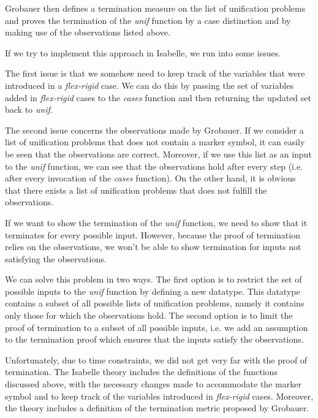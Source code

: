 Grobauer then defines a termination measure on the list of unification problems and proves the termination of the \textit{unif} function by a case distinction and by making use of the observations listed above.

If we try to implement this approach in Isabelle, we run into some issues.

The first issue is that we somehow need to keep track of the variables that were introduced in a \textit{flex-rigid} case. We can do this by passing the set of variables added in \textit{flex-rigid} cases to the \textit{cases} function and then returning the updated set back to \textit{unif}.

The second issue concerns the observations made by Grobauer. If we consider a list of unification problems that does not contain a marker symbol, it can easily be seen that the observations are correct. Moreover, if we use this list as an input to the \textit{unif} function, we can see that the observations hold after every step (i.e. after every invocation of the \textit{cases} function). On the other hand, it is obvious that there exists a list of unification problems that does not fulfill the observations.

If we want to show the termination of the \textit{unif} function, we need to show that it terminates for every possible input. However, because the proof of termination relies on the observations, we won't be able to show termination for inputs not satisfying the observations.

We can solve this problem in two ways. The first option is to restrict the set of possible inputs to the \textit{unif} function by defining a new datatype. This datatype contains a subset of all possible lists of unification problems, namely it contains only those for which the observations hold. The second option is to limit the proof of termination to a subset of all possible inputs, i.e. we add an assumption to the termination proof which ensures that the inputs satisfy the observations.

Unfortunately, due to time constraints, we did not get very far with the proof of termination. The Isabelle theory includes the definitions of the functions discussed above, with the necessary changes made to accommodate the marker symbol and to keep track of the variables introduced in \textit{flex-rigid} cases. Moreover, the theory includes a definition of the termination metric proposed by Grobauer.